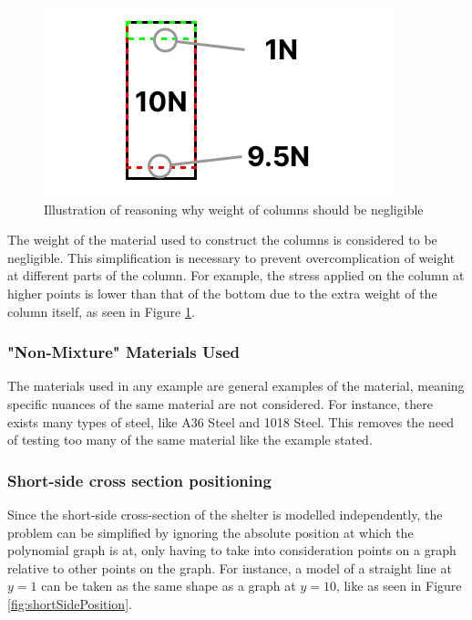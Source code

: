 \documentclass[a4paper,titlepage]{article}
\begin{document}
\begin{figure}[htbp]
    \centering
    \includegraphics[width=\textwidth]{negligibleWeightOfColumn.png}
    \caption{Illustration of reasoning why weight of columns should be negligible}
    \label{fig:negligibleWeightOfColumn}
\end{figure}

The weight of the material used to construct the columns is considered to be negligible. This simplification is necessary to prevent overcomplication of weight at different parts of the column. For example, the stress applied on the column at higher points is lower than that of the bottom due to the extra weight of the column itself, as seen in Figure \ref{fig:negligibleWeightOfColumn}.

\subsubsection{"Non-Mixture" Materials Used}
The materials used in any example are general examples of the material, meaning specific nuances of the same material are not considered. For instance, there exists many types of steel, like A36 Steel and 1018 Steel. This removes the need of testing too many of the same material like the example stated.

\subsubsection{Short-side cross section positioning}

Since the short-side cross-section of the shelter is modelled independently, the problem can be simplified by ignoring the absolute position at which the polynomial graph is at, only having to take into consideration points on a graph relative to other points on the graph. For instance, a model of a straight line at $y=1$ can be taken as the same shape as a graph at $y=10$, like as seen in Figure \ref{fig:shortSidePosition}.
\end{document}
